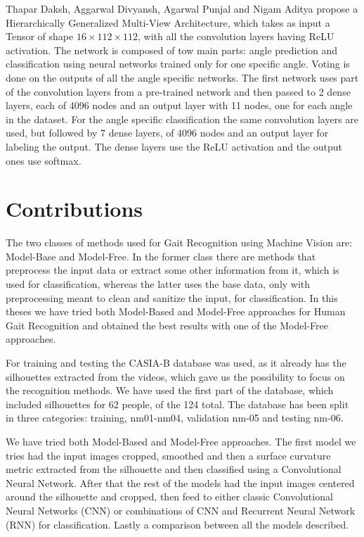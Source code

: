 \documentclass[12pt]{article}
\theoremstyle{definition}
\begin{document}
	Thapar Daksh, Aggarwal Divyansh, Agarwal Punjal and Nigam Aditya \cite{VGR-Net} propose a Hierarchically Generalized Multi-View Architecture, which takes as input a Tensor of shape $16 \times 112 \times 112$, with all the convolution layers having ReLU activation. The network is composed of tow main parts: angle prediction and classification using neural networks trained only for one specific angle. Voting is done on the outputs of all the angle specific networks. The first network uses part of the convolution layers from a pre-trained network and then passed to 2 dense layers, each of 4096 nodes and an output layer with 11 nodes, one for each angle in the dataset. For the angle specific classification the same convolution layers are used, but followed by 7 dense layers, of 4096 nodes and an output layer for labeling the output. The dense layers use the ReLU activation and the output ones use softmax.
	\clearpage

	\section{Contributions}
	\vspace{1cm}

	The two classes of methods used for Gait Recognition using Machine Vision are: Model-Base and Model-Free. In the former class there are methods that preprocess the input data or extract some other information from it, which is used for classification, whereas the latter uses the base data, only with preprocessing meant to clean and sanitize the input, for classification. In this theses we have tried both Model-Based and Model-Free approaches for Human Gait Recognition and obtained the best results with one of the Model-Free approaches.

	For training and testing the CASIA-B database \cite{casia1}\cite{casia2}\cite{casia3} was used, as it already has the silhouettes extracted from the videos, which gave us the possibility to focus on the recognition methods. We have used the first part of the database, which included silhouettes for 62 people, of the 124 total. The database has been split in three categories: training, nm01-nm04, validation nm-05 and testing nm-06.

	We have tried both Model-Based and Model-Free approaches. The first model we tries had the input images cropped, smoothed and then a surface curvature metric extracted from the silhouette and then classified using a Convolutional Neural Network. After that the rest of the models had the input images centered around the silhouette and cropped, then feed to either classic Convolutional Neural Networks (CNN) or combinations of CNN and Recurrent Neural Network (RNN) for classification. Lastly a comparison between all the models described.
\end{document}
